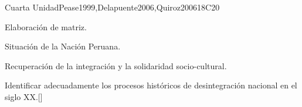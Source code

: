 \begin{syllabus}
\begin{unit}{}{Cuarta Unidad}{Pease1999,Delapuente2006,Quiroz2006}{18}{C20}
\begin{topics}
\begin{subtopics}
	    \item Elaboración de matriz.
	  \end{subtopics}
    \item Situación de la Nación Peruana.
    \item Recuperación de la integración y la solidaridad socio-cultural.
\end{topics}
\begin{learningoutcomes}
	\item Identificar adecuadamente los procesos históricos de desintegración nacional en el siglo XX.[\Familiarity]
\end{learningoutcomes}
\end{unit}



\begin{coursebibliography}
\end{coursebibliography}

\end{syllabus}
